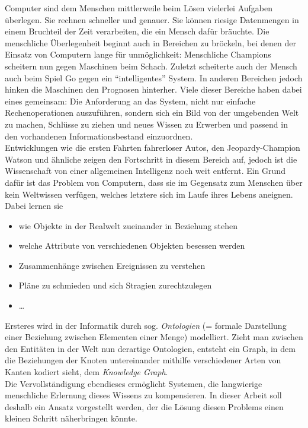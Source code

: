 Computer sind dem Menschen mittlerweile beim Lösen vielerlei Aufgaben überlegen. Sie rechnen schneller und genauer.
Sie können riesige Datenmengen in einem Bruchteil der Zeit verarbeiten, die ein Mensch dafür bräuchte. Die menschliche
Überlegenheit beginnt auch in Bereichen zu bröckeln, bei denen der Einsatz von Computern lange für unmöglichkeit: Menschliche
Champions scheitern nun gegen Maschinen beim Schach. Zuletzt scheiterte auch der Mensch auch beim Spiel Go gegen ein ``intelligentes'' System.
In anderen Bereichen jedoch hinken die Maschinen den Prognosen hinterher. Viele dieser Bereiche haben dabei eines gemeinsam:
Die Anforderung an das System, nicht nur einfache Rechenoperationen auszuführen, sondern sich ein Bild von der umgebenden Welt zu machen,
Schlüsse zu ziehen und neues Wissen zu Erwerben und passend in den vorhandenen Informationsbestand einzuordnen.\\
Entwicklungen wie die ersten Fahrten fahrerloser Autos, den Jeopardy-Champion Watson und ähnliche zeigen den Fortschritt in diesem Bereich auf,
jedoch ist die Wissenschaft von einer allgemeinen Intelligenz noch weit entfernt. Ein Grund dafür ist das Problem von Computern,
dass sie im Gegensatz zum Menschen über kein Weltwissen verfügen, welches letztere sich im Laufe ihres Lebens aneignen.
Dabei lernen sie
\begin{itemize}
  \item wie Objekte in der Realwelt zueinander in Beziehung stehen
  \item welche Attribute von verschiedenen Objekten besessen werden
  \item Zusammenhänge zwischen Ereignissen zu verstehen
  \item Pläne zu schmieden und sich Stragien zurechtzulegen
  \item \ldots
\end{itemize}

Ersteres wird in der Informatik durch sog. \emph{Ontologien} (= formale Darstellung einer Beziehung zwischen Elementen einer Menge)
modelliert. Zieht man zwischen den Entitäten in der Welt nun derartige Ontologien, entsteht ein Graph, in dem die Beziehungen
der Knoten untereinander mithilfe verschiedener Arten von Kanten kodiert sieht, dem \emph{Knowledge Graph}.\\
Die Vervollständigung ebendieses ermöglicht Systemen, die langwierige menschliche Erlernung dieses Wissens zu kompensieren.
In dieser Arbeit soll deshalb ein Ansatz vorgestellt werden, der die Lösung diesen Problems einen kleinen Schritt näherbringen könnte.

